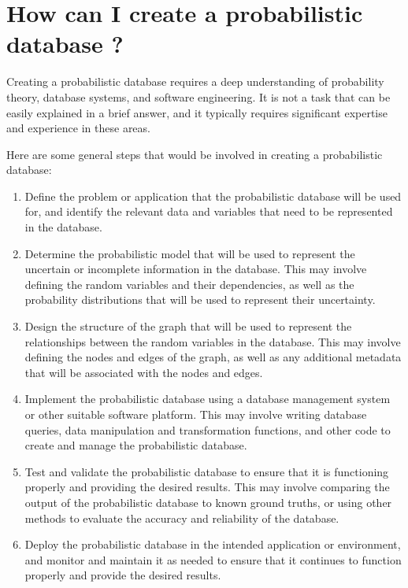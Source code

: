 \chapter{ How can I create a probabilistic database ? }

Creating a probabilistic database requires a deep understanding of probability theory, database systems, and software engineering. It is not a task that can be easily explained in a brief answer, and it typically requires significant expertise and experience in these areas.

\vspace{1cm}
Here are some general steps that would be involved in creating a probabilistic database:

\begin{enumerate}
	\item Define the problem or application that the probabilistic database will be used for, and identify the relevant data and variables that need to be represented in the database.
	
	\item Determine the probabilistic model that will be used to represent the uncertain or incomplete information in the database. This may involve defining the random variables and their dependencies, as well as the probability distributions that will be used to represent their uncertainty.
	
	\item Design the structure of the graph that will be used to represent the relationships between the random variables in the database. This may involve defining the nodes and edges of the graph, as well as any additional metadata that will be associated with the nodes and edges.
	
	\item Implement the probabilistic database using a database management system or other suitable software platform. This may involve writing database queries, data manipulation and transformation functions, and other code to create and manage the probabilistic database.
	
	\item Test and validate the probabilistic database to ensure that it is functioning properly and providing the desired results. This may involve comparing the output of the probabilistic database to known ground truths, or using other methods to evaluate the accuracy and reliability of the database.
	
	\item  Deploy the probabilistic database in the intended application or environment, and monitor and maintain it as needed to ensure that it continues to function properly and provide the desired results.
	
\end{enumerate}

